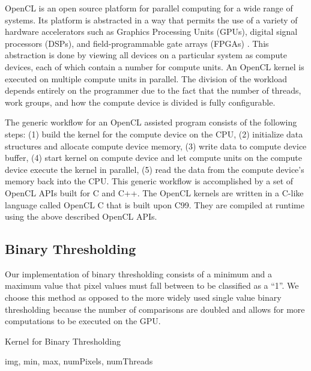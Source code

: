 \documentclass[conference]{IEEEtran}
\begin{document}
OpenCL is an open source platform for parallel computing for a wide range of systems. Its platform is abstracted in a way that permits the use of a variety of hardware accelerators such as Graphics Processing Units (GPUs), digital signal processors (DSPs), and field-programmable gate arrays (FPGAs) \cite{Khronos}. This abstraction is done by viewing all devices on a particular system as compute devices, each of which contain a number for compute units. An OpenCL kernel is executed on multiple compute units in parallel. The division of the workload depends entirely on the programmer due to the fact that the number of threads, work groups, and how the compute device is divided is fully configurable. 

The generic workflow for an OpenCL assisted program consists of the following steps: (1) build the kernel for the compute device on the CPU, (2) initialize data structures and allocate compute device memory, (3) write data to compute device buffer, (4) start kernel on compute device and let compute units on the compute device execute the kernel in parallel, (5) read the data from the compute device’s memory back into the CPU. This generic workflow is accomplished by a set of OpenCL APIs built for C and C++. The OpenCL kernels are written in a C-like language called OpenCL C that is built upon C99. They are compiled at runtime using the above described OpenCL APIs.

\subsection{Binary Thresholding}
Our implementation of binary thresholding consists of a minimum and a maximum value that pixel values must fall between to be classified as a “1”. We choose this method as opposed to the more widely used single value binary thresholding because the number of comparisons are doubled and allows for more computations to be executed on the GPU. 

\begin{algorithm}[H]
\caption{Kernel for Binary Thresholding}
\begin{algorithmic}[1]
\renewcommand{\algorithmicrequire}{\textbf{Input:}}
\REQUIRE img, min, max, numPixels, numThreads
\ENDFOR
\end{algorithmic}
\end{algorithm}
\end{document}
